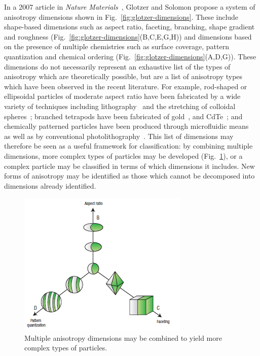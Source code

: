 In a 2007 article in \textit{Nature Materials}~\cite{glotzer-solomon}, Glotzer and Solomon propose a system of anisotropy 
dimensions shown in Fig.~\ref{fig:glotzer-dimensions}. These include shape-based dimensions such as aspect 
ratio, faceting, branching, shape gradient 
and roughness (Fig.~\ref{fig:glotzer-dimensions}(B,C,E,G,H)) and dimensions based on the presence of
multiple chemistries such as surface coverage, pattern quantization and chemical ordering 
(Fig.~\ref{fig:glotzer-dimensions}(A,D,G)).  These dimensions do not necessarily 
represent an exhaustive list of the types
of anisotropy which are theoretically possible, but are a list of anisotropy types which have been observed in the
recent literature.  For example, rod-shaped or ellipsoidal particles of moderate aspect ratio have been fabricated 
by a wide variety of techniques including 
lithography~\cite{desimone-shear} and the stretching of colloidal spheres~\cite{rods-mohraz}; branched 
tetrapods have been fabricated of gold~\cite{gold-tetrapods},
and CdTe~\cite{cdte-tetrapods}; and chemically patterned particles have been produced
through microfluidic means~\cite{shepherd-janus}
as well as by conventional photolithography~\cite{desimone-janus}.  This list of dimensions may therefore
be seen as a useful framework for classification: by combining multiple dimensions, more complex types of particles may be 
developed (Fig.~\ref{fig:dimensions-combined}), or a complex particle may be classified in terms of which dimensions it includes.
New forms of anisotropy may be identified as those which cannot be decomposed into dimensions already identified.

\begin{figure}[h]
\begin{center}
\includegraphics{figures/glotzer-combine-dimensions.png}
\end{center}
\caption{Multiple anisotropy dimensions may be combined to yield more complex types of particles.~\cite{glotzer-solomon}}
\label{fig:dimensions-combined}
\end{figure}

